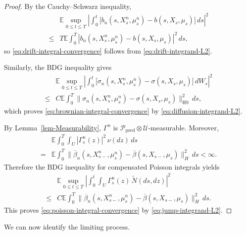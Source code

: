 \documentclass[12pt,oneside, reqno]{amsart}
\numberwithin{equation}{section}
\begin{document}
	\begin{proof}
		By the Cauchy--Schwarz inequality,
		\[
		\begin{aligned}
			&
			\mathbb E\sup_{0\leq t\leq T}
			\left|
			\int_0^t
			\bigl[
			b_n(s,X_s^n,\mu_s^n)
			-
			b(s,X_s,\mu_s)
			\bigr]\,ds
			\right|^2
			\\
			\leq&
			T\mathbb E\int_0^T
			|b_n(s,X_s^n,\mu_s^n)
			-b(s,X_s,\mu_s)|^2\,ds,
		\end{aligned}
		\]
		so \eqref{eq:drift-integral-convergence} follows from
		\eqref{eq:drift-integrand-L2}.
		
		Similarly, the BDG inequality gives
		\[
		\begin{aligned}
			&
			\mathbb E\sup_{0\leq t\leq T}
			\left|
			\int_0^t
			\bigl[
			\sigma_n(s,X_s^n,\mu_s^n)
			-
			\sigma(s,X_s,\mu_s)
			\bigr]\,dW_s
			\right|^2
			\\
			\leq&
			C\mathbb E\int_0^T
			\|\sigma_n(s,X_s^n,\mu_s^n)
			-\sigma(s,X_s,\mu_s)\|_{\mathrm{HS}}^2\,ds,
		\end{aligned}
		\]
		which proves \eqref{eq:brownian-integral-convergence} by
		\eqref{eq:diffusion-integrand-L2}.
		
		By Lemma~\ref{lem-Measurability},
		\(\Gamma^n\) is
		\(\mathcal P_{\mathrm{pred}}\otimes\mathcal U\)-measurable.
		Moreover,
		\[
		\begin{aligned}
			&\mathbb E\int_0^T\int_U
			|\Gamma_s^n(z)|^2\,\nu(dz)\,ds
			\\
			=&
			\mathbb E\int_0^T
			\|
			\overline\beta_n(s,X_{s-}^n,\mu_s^n)
			-
			\overline\beta(s,X_{s-},\mu_s)
			\|_H^2\,ds
			<\infty.
		\end{aligned}
		\]
		Therefore the BDG inequality for compensated Poisson integrals yields
		\[
		\begin{aligned}
			&
			\mathbb E\sup_{0\leq t\leq T}
			\left|
			\int_0^t\int_U
			\Gamma_s^n(z)\,
			\widetilde N(ds,dz)
			\right|^2
			\\
			\leq&
			C\mathbb E\int_0^T
			\|\overline\beta_n(s,X_{s-}^n,\mu_s^n)
			-\overline\beta(s,X_{s-},\mu_s)\|_H^2\,ds.
		\end{aligned}
		\]
		This proves \eqref{eq:poisson-integral-convergence} by
		\eqref{eq:jump-integrand-L2}.
	\end{proof}
	
	
	
	We can now identify the limiting process.
	
\end{document}
